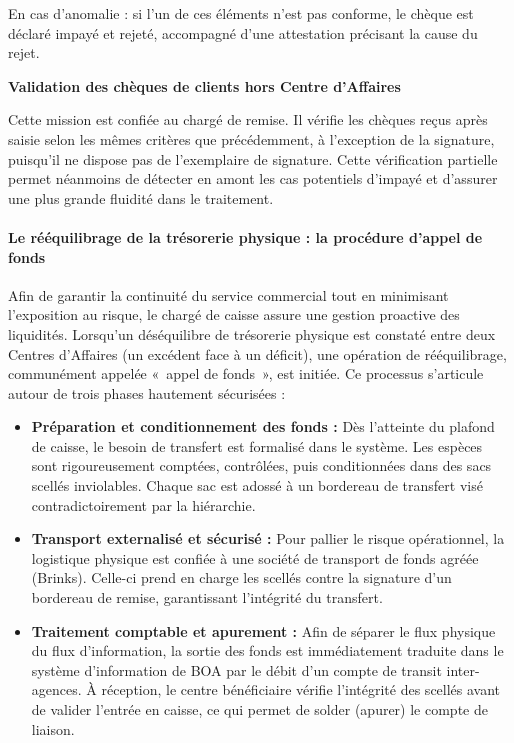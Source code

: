 \documentclass[12pt,a4paper]{report}
\begin{document}
En cas d'anomalie : si l'un de ces éléments n'est pas conforme, le chèque est déclaré impayé et rejeté, accompagné d'une attestation précisant la cause du rejet.

\medskip\textbf{Validation des chèques de clients hors Centre d'Affaires}

Cette mission est confiée au chargé de remise. Il vérifie les chèques reçus après saisie selon les mêmes critères que précédemment, à l'exception de la signature, puisqu'il ne dispose pas de l'exemplaire de signature. Cette vérification partielle permet néanmoins de détecter en amont les cas potentiels d'impayé et d'assurer une plus grande fluidité dans le traitement.

\paragraph{Le rééquilibrage de la trésorerie physique : la procédure d'appel de fonds}

Afin de garantir la continuité du service commercial tout en minimisant l'exposition au risque, le chargé de caisse assure une gestion proactive des liquidités. Lorsqu'un déséquilibre de trésorerie physique est constaté entre deux Centres d'Affaires (un excédent face à un déficit), une opération de rééquilibrage, communément appelée «~appel de fonds~», est initiée. Ce processus s'articule autour de trois phases hautement sécurisées :

\begin{itemize}
  \item \textbf{Préparation et conditionnement des fonds :} Dès l'atteinte du plafond de caisse, le besoin de transfert est formalisé dans le système. Les espèces sont rigoureusement comptées, contrôlées, puis conditionnées dans des sacs scellés inviolables. Chaque sac est adossé à un bordereau de transfert visé contradictoirement par la hiérarchie.
  \item \textbf{Transport externalisé et sécurisé :} Pour pallier le risque opérationnel, la logistique physique est confiée à une société de transport de fonds agréée (Brinks). Celle-ci prend en charge les scellés contre la signature d'un bordereau de remise, garantissant l'intégrité du transfert.
  \item \textbf{Traitement comptable et apurement :} Afin de séparer le flux physique du flux d'information, la sortie des fonds est immédiatement traduite dans le système d'information de BOA par le débit d'un compte de transit inter-agences. À réception, le centre bénéficiaire vérifie l'intégrité des scellés avant de valider l'entrée en caisse, ce qui permet de solder (apurer) le compte de liaison.
\end{itemize}
\end{document}
